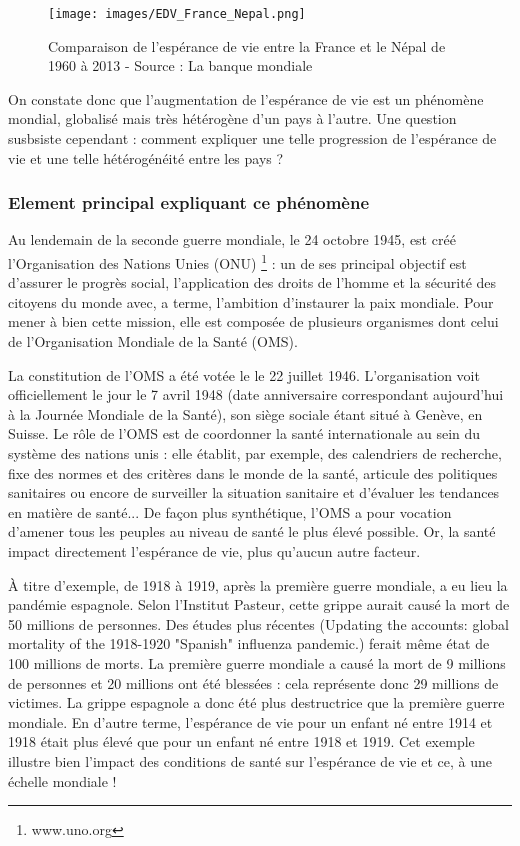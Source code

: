 \begin{figure}[htbp]
\begin{center}
\texttt{[image: images/EDV\_France\_Nepal.png]} 
\end{center}
\caption{Comparaison de l'espérance de vie entre la France et le Népal de 1960 à 2013 - Source : La banque mondiale}
\label{Comparaison de l'espérance de vie entre la France et le Népal de 1960 à 2013 - La banque mondiale}
\end{figure}

On constate donc que l'augmentation de l'espérance de vie est un phénomène mondial, globalisé mais très hétérogène d'un pays à l'autre.
Une question susbsiste cependant : comment expliquer une telle progression de l'espérance de vie et une telle hétérogénéité entre les pays ?

\subsubsection*{Element principal expliquant ce phénomène}

Au lendemain de la seconde guerre mondiale, le 24 octobre 1945, est créé l'Organisation des Nations Unies (ONU) \footnote{www.uno.org} : un de ses principal objectif est d'assurer le progrès social, l'application des droits de l'homme et la sécurité des citoyens du monde avec, a terme, l'ambition d'instaurer la paix mondiale. Pour mener à bien cette mission, elle est composée de plusieurs organismes dont celui de l'Organisation Mondiale de la Santé (OMS). 


La constitution de l'OMS a été votée le le 22 juillet 1946. L'organisation voit officiellement le jour le 7 avril 1948 (date anniversaire correspondant aujourd'hui à la Journée Mondiale de la Santé), son siège sociale étant situé à Genève, en Suisse.
Le rôle de l'OMS est de coordonner la santé internationale au sein du système des nations unis : elle établit, par exemple, des calendriers de recherche, fixe des normes et des critères dans le monde de la santé, articule des politiques sanitaires ou encore de surveiller la situation sanitaire et d'évaluer les tendances en matière de santé... De façon plus synthétique, l'OMS a pour vocation d'amener tous les peuples au niveau de santé le plus élevé possible. Or, la santé impact directement l'espérance de vie, plus qu'aucun autre facteur.


À titre d'exemple, de 1918 à 1919, après la première guerre mondiale, a eu lieu la pandémie espagnole. Selon l'Institut Pasteur, cette grippe aurait causé la mort de 50 millions de personnes. Des études plus récentes (Updating the accounts: global mortality of the 1918-1920 "Spanish" influenza pandemic.) ferait même état de 100 millions de morts. La première guerre mondiale a causé la mort de 9 millions de personnes et 20 millions ont été blessées : cela représente donc 29 millions de victimes. La grippe espagnole a donc été plus destructrice que la première guerre mondiale. En d'autre terme, l'espérance de vie pour un enfant né entre 1914 et 1918 était plus élevé que pour un enfant né entre 1918 et 1919. Cet exemple illustre bien l'impact des conditions de santé sur l'espérance de vie et ce, à une échelle mondiale !



